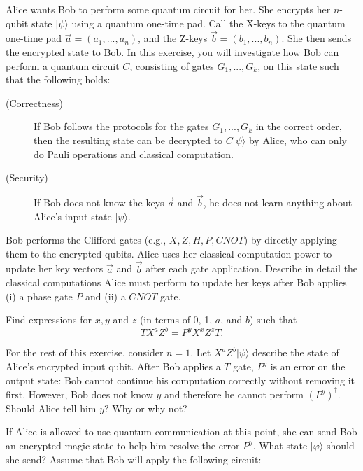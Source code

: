 \documentclass[a4paper,10pt,landscape,twocolumn]{scrartcl}
\newcommand{\ket}[1]{| #1 \rangle}
\begin{document}
\begin{exercise}
	Alice wants Bob to perform some quantum circuit for her. She encrypts her $n$-qubit state $\ket\psi$ using a quantum one-time pad. Call the X-keys to the quantum one-time pad $\vec{a} = (a_1, ..., a_n)$, and the Z-keys $\vec{b} = (b_1, ..., b_n)$. She then sends the encrypted state to Bob. In this exercise, you will investigate how Bob can perform a quantum circuit $C$, consisting of gates $G_1, ..., G_k$, on this state such that the following holds:
\begin{description}
\item[(Correctness)] If Bob follows the protocols for the gates $G_1, ..., G_k$ in the correct order, then the resulting state can be decrypted to $C\ket\psi$ by Alice, who can only do Pauli operations and classical computation.
\item[(Security)] If Bob does not know the keys $\vec{a}$ and $\vec{b}$, he does not learn anything about Alice's input state $\ket\psi$.
\end{description}
	\begin{subex}
		Bob performs the Clifford gates (e.g., $X, Z, H, P, CNOT$) by directly applying them to the encrypted qubits. Alice uses her classical computation power to update her key vectors $\vec{a}$ and $\vec{b}$ after each gate application. Describe in detail the classical computations Alice must perform to update her keys after Bob applies (i) a phase gate $P$ and (ii) a $CNOT$ gate.
	\end{subex}
	\begin{subex}
		 Find expressions for $x, y$ and $z$ (in terms of 0, 1, $a$, and $b$) such that
		\[
		TX^{a}Z^{b} = P^yX^xZ^zT.
		\]
	\end{subex}
	\begin{subex}
		For the rest of this exercise, consider $n = 1$. Let $X^{a}Z^{b}\ket\psi$ describe the state of Alice's encrypted input qubit. After Bob applies a $T$ gate, $P^y$ is an error on the output state: Bob cannot continue his computation correctly without removing it first. However, Bob does not know $y$ and therefore he cannot perform $(P^y)^{\dagger}$. Should Alice tell him $y$? Why or why not?
	\end{subex}
	\begin{subex}
	If Alice is allowed to use quantum communication at this point, she can send Bob an encrypted magic state to help him resolve the error $P^y$. What state $\ket\varphi$ should she send? Assume that Bob will apply the following circuit:
	\begin{center}
\end{center}
\end{subex}
\end{exercise}
\end{document}
